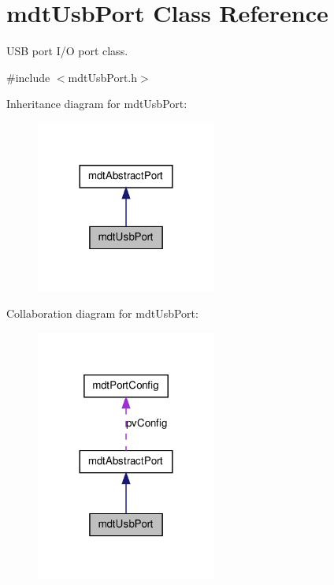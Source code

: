 \hypertarget{classmdt_usb_port}{
\section{mdtUsbPort Class Reference}
\label{classmdt_usb_port}
}


USB port I/O port class.  




{\ttfamily \#include $<$mdtUsbPort.h$>$}



Inheritance diagram for mdtUsbPort:\nopagebreak
\begin{figure}[H]
\begin{center}
\leavevmode
\includegraphics[width=168pt]{classmdt_usb_port__inherit__graph}
\end{center}
\end{figure}


Collaboration diagram for mdtUsbPort:\nopagebreak
\begin{figure}[H]
\begin{center}
\leavevmode
\includegraphics[width=168pt]{classmdt_usb_port__coll__graph}
\end{center}
\end{figure}
